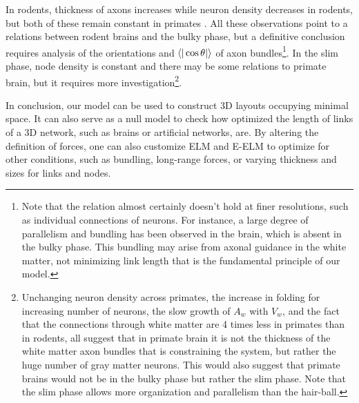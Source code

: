 \documentclass[nofootinbib,preprint,endfloats]{revtex4} %
\begin{document}
In rodents, thickness of axons increases while neuron density decreases in rodents, but both of these remain constant in primates \cite{herculano2012remarkable}. All these observations point to a relations between rodent brains and the bulky phase, but a definitive conclusion requires analysis of the orientations and $\be{|\cos\theta|}$ of axon bundles\footnote{
Note that the relation almost certainly doesn't hold at finer resolutions, such as individual connections of neurons. 
For instance, a large degree of parallelism and bundling has been observed in the brain\cite{le2001diffusion,assaf2008diffusion}, which is absent in the bulky phase. This bundling may arise from axonal guidance in the white matter, not minimizing link length that is the fundamental principle of our model.}. 
In the slim phase, node density is constant and there may be some relations to primate brain, but it requires more investigation\footnote{
Unchanging neuron density across primates, the increase in folding for increasing number of neurons, the slow growth of $A_w$ with $V_w$, and the fact that the connections through white matter are 4 times less in primates than in rodents\cite{herculano2012remarkable}, all suggest that in primate brain it is not the thickness of the white matter axon bundles that is constraining the system, but rather the huge number of gray matter neurons. 
This would also suggest that primate brains would not be in the bulky phase but rather the slim phase. Note that the slim phase allows more organization and parallelism than the hair-ball.}.


In conclusion, our model can be used to construct 3D layouts occupying minimal space. It can also serve  as a null model to check how optimized the length of links of a 3D network, such as brains or artificial networks, are. By altering the definition  of forces, one can also customize ELM and E-ELM to optimize for other conditions, such as bundling, long-range forces, or varying thickness and sizes for links and nodes. 



\newpage
\newpage
\end{document}
